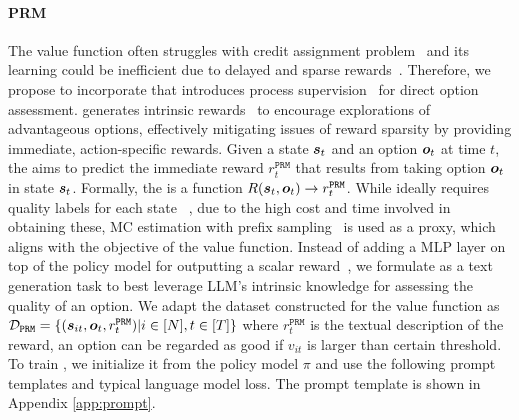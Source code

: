 \paragraph{PRM} The value function often struggles with credit assignment problem~\citep{sutton1984temporal} and its learning could be inefficient due to delayed and sparse rewards~\citep{sutton2018reinforcement}. Therefore, we propose to incorporate \prm{} that introduces process supervision~\citep{lightman2023let} for direct option assessment. \prm{} generates intrinsic rewards~\citep{chentanez2004intrinsically} to encourage explorations of advantageous options, effectively mitigating issues of reward sparsity by providing immediate, action-specific rewards. Given a state ${\bm{s}}_t$ and an option ${\bm{o}}_t$ at time $t$, the \prm{} aims to predict the immediate reward $r_t^{\texttt{PRM}}$ that results from taking option ${\bm{o}}_t$ in state ${\bm{s}}_t$. Formally, the \prm{} is a function $R({\bm{s}}_t, {\bm{o}}_t) \rightarrow r^{\mathtt{PRM}}_t$. While \prm{} ideally requires quality labels for each state ~\citep{uesato2022solving}, due to the high cost and time involved in obtaining these, MC estimation with prefix sampling~\citep{wang2023math} is used as a proxy, which aligns with the objective of the value function. Instead of adding a MLP layer on top of the policy model for outputting a scalar reward~\citep{ouyang2022training}, we formulate \prm{} as a text generation task to best leverage LLM's intrinsic knowledge for assessing the quality of an option. We adapt the dataset constructed for the value function as ${\mathcal{D}}_{\mathtt{PRM}} = \{ ({\bm{s}}_{it}, {\bm{o}}_t, r_t^{\mathtt{PRM}} ) | i\in[N], t\in[T]\}$ where $r_t^{\mathtt{PRM}}$ is the textual description of the reward, \eg an option can be regarded as good if $v_{it}$ is larger than certain threshold. To train \prm{},  we initialize it from the policy model $\pi$ and use the following prompt templates and typical language model loss. The prompt template is shown in Appendix \ref{app:prompt}.


